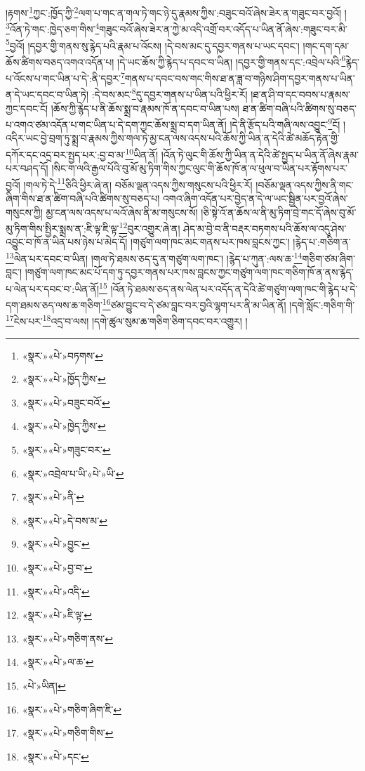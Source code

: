 །རྟགས་\footnote{«སྣར་»«པེ་»བཏགས་}ཀྱང་:ཁྱོད་ཀྱི་\footnote{«སྣར་»«པེ་»ཁྱོད་ཀྱིས་}ལག་པ་གང་ན་གལ་ཏེ་གང་ཉེ་དུ་རྣམས་ཀྱིས་:བཟུང་བའོ་ཞེས་ཟེར་ན་གཟུང་བར་བྱའོ། །\footnote{«སྣར་»«པེ་»བཟུང་བའོ་}འོན་ཏེ་གང་:ཁྱེད་ཅག་གིས་\footnote{«སྣར་»«པེ་»ཁྱེད་ཀྱིས་}གཟུང་བའོ་ཞེས་ཟེར་ན་ཀྱེ་མ་འདི་འགྲོ་བར་འདོད་པ་ཡིན་ནོ་ཞེས་:གཟུང་བར་མི་\footnote{«སྣར་»«པེ་»གཟུང་བར་}བྱའོ། །དབྱར་གྱི་གནས་སུ་རྙེད་པའི་རྣམ་པ་འོངས། །དེ་བས་མང་དུ་དབྱར་གནས་པ་ཡང་དབང་། །གང་དག་དམ་ཆོས་ཚིགས་བཅད་འགའ་འདོན་པ། །དེ་ཡང་ཆོས་ཀྱི་རྙེད་པ་དབང་བ་ཡིན། །དབྱར་གྱི་གནས་དང་:འབྲེལ་པའི་\footnote{«སྣར་»འབྲེལ་པ་ཡི་«པེ་»ཡི་}རྙེད་པ་འོངས་པ་གང་ཡིན་པ་དེ་:ནི་དབྱར་\footnote{«སྣར་»«པེ་»ནི་}གནས་པ་དབང་བས་གང་གིས་ཐ་ན་ཟླ་བ་གཉིས་ཤིག་དབྱར་གནས་པ་ཡིན་ན་དེ་ཡང་དབང་བ་ཡིན་ཏེ། :དེ་བས་མང་\footnote{«སྣར་»«པེ་»དེ་བས་མ་}དུ་དབྱར་གནས་པ་ཡིན་པའི་ཕྱིར་རོ། །ཐ་ན་ཤི་བ་དང་བབས་པ་རྣམས་ཀྱང་དབང་ངོ། །ཆོས་ཀྱི་རྙེད་པ་ནི་ཆོས་སྨྲ་བ་རྣམས་ཁོ་ན་དབང་བ་ཡིན་པས། ཐ་ན་ཚིག་བཞི་པའི་ཚིགས་སུ་བཅད་པ་འགའ་ཙམ་འདོན་པ་གང་ཡིན་པ་དེ་དག་ཀྱང་ཆོས་སྨྲ་བ་དག་ཡིན་ནོ། །དེ་ནི་རྩོད་པའི་གཞི་ལས་འབྱུང་\footnote{«སྣར་»«པེ་»བྱུང་}ངོ། །འདིར་ཡང་བྱེ་བྲག་ཏུ་སྨྲ་བ་རྣམས་ཀྱིས་གལ་ཏེ་མྱ་ངན་ལས་འདས་པའི་ཆོས་ཀྱི་ཡིན་ན་དེའི་ཚེ་མཆོད་རྟེན་གྱི་དཀོར་དང་འདྲ་བར་སྤྱད་པར་:བྱ་བ་མ་\footnote{«སྣར་»«པེ་»བྱ་བ་}ཡིན་ནོ། །འོན་ཏེ་ལུང་གི་ཆོས་ཀྱི་ཡིན་ན་དེའི་ཚེ་སྤྱད་པ་ཡིན་ནོ་ཞེས་རྣམ་པར་བཤད་དོ། །སིང་ག་ལའི་རྒྱལ་པོའི་བུ་མོ་མུ་ཏིག་གིས་ཀྱང་ལུང་གི་ཆོས་ཁོ་ན་ལ་ཕུལ་བ་ཡིན་པར་རྟོགས་པར་བྱའོ། །གལ་ཏེ་དེ་\footnote{«སྣར་»«པེ་»འདི་}ཅིའི་ཕྱིར་ཞེ་ན། བཅོམ་ལྡན་འདས་ཀྱིས་གསུངས་པའི་ཕྱིར་རོ། །བཅོམ་ལྡན་འདས་ཀྱིས་ནི་གང་ཞིག་གིས་ཐ་ན་ཚིག་བཞི་པའི་ཚིགས་སུ་བཅད་པ། འགའ་ཞིག་འདོན་པར་བྱེད་ན་དེ་ལ་ཡང་སྦྱིན་པར་བྱའོ་ཞེས་གསུངས་ཀྱི། མྱ་ངན་ལས་འདས་པ་ལའོ་ཞེས་ནི་མ་གསུངས་སོ། །ཅི་སྟེ་འོ་ན་ཆོས་ལ་ནི་མུ་ཏིག་བྲེ་གང་དོ་ཞེས་བུ་མོ་མུ་ཏིག་གིས་སྤྱིར་སྨྲས་ན་:ཇི་ལྟ་ཇི་ལྟ་\footnote{«སྣར་»«པེ་»ཇི་ལྟ་}བུར་འགྱུར་ཞེ་ན། ཤེད་མ་བྱེ་བ་ནི་བརྡར་བཏགས་པའི་ཆོས་ལ་འདུ་ཤེས་འབྱུང་བ་ཁོ་ན་ཡིན་པས་ཉེས་པ་མེད་དོ། །གཙུག་ལག་ཁང་མང་གནས་པར་ཁས་བླངས་ཀྱང་། །རྙེད་པ་:གཅིག་ན་\footnote{«སྣར་»«པེ་»གཅིག་ནས་}ལེན་པར་དབང་བ་ཡིན། །གལ་ཏེ་ཐམས་ཅད་དུ་ན་གཙུག་ལག་ཁང་། །རྙེད་པ་ཀུན་:ལས་ཆ་\footnote{«སྣར་»«པེ་»ལ་ཆ་}གཅིག་ཙམ་ཞིག་བླང་། །གཙུག་ལག་ཁང་མང་པོ་དག་ཏུ་དབྱར་གནས་པར་ཁས་བླངས་ཀྱང་གཙུག་ལག་ཁང་གཅིག་ཁོ་ན་ནས་རྙེད་པ་ལེན་པར་དབང་བ་:ཡིན་ནོ།\footnote{«པེ་»ཡིན།} །འོན་ཏེ་ཐམས་ཅད་ནས་ལེན་པར་འདོད་ན་དེའི་ཚེ་གཙུག་ལག་ཁང་གི་རྙེད་པ་དེ་དག་ཐམས་ཅད་ལས་ཆ་གཅིག་\footnote{«སྣར་»«པེ་»གཅིག་ཞིག་ཇི་}ཙམ་བྱུང་བ་དེ་ཙམ་བླང་བར་བྱའི་ལྷག་པར་ནི་མ་ཡིན་ནོ། །དགེ་སློང་:གཅིག་གི་\footnote{«སྣར་»«པེ་»གཅིག་གིས་}ངེས་པར་\footnote{«སྣར་»«པེ་»དང་}འདྲ་བ་ལས། །དགེ་ཚུལ་སུམ་ཆ་གཅིག་ཅིག་དབང་བར་འགྱུར། །
